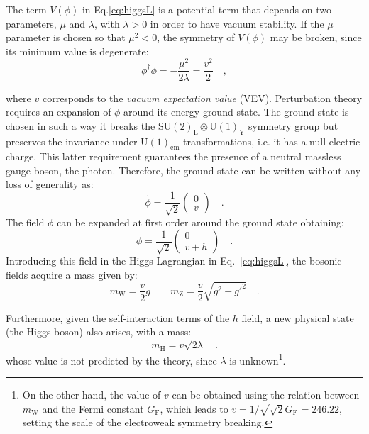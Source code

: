 The term $V(\phi)$ in Eq.\eqref{eq:higgsL} is a potential term that depends on two parameters, $\mu$ and $\lambda$, with $\lambda>0$ in order to have vacuum stability. If the $\mu$ parameter is chosen so that $\mu^2<0$, the symmetry of $V(\phi)$ may be broken, since its minimum value is degenerate:
\begin{equation}
\phi^\dagger\phi = -\frac{\mu^2}{2\lambda} = \frac{v^2}{2} \quad ,
\end{equation}

\noindent where $v$ corresponds to the \emph{vacuum expectation value} (VEV). Perturbation theory requires an expansion of $\phi$ around its energy ground state. The ground state is chosen in such a way it  breaks the $\mathrm{SU(2)_L \otimes U(1)_Y}$ symmetry group but preserves the invariance under $\mathrm{U(1)_{em}}$ transformations, i.e. it has a null electric charge. This latter requirement guarantees the presence of a neutral massless gauge boson, the photon. Therefore, the ground state can be written without any loss of generality as:
\begin{equation}
\tilde{\phi} = \frac{1}{\sqrt{2}} \begin{pmatrix} 0 \\ v   \end{pmatrix}\quad .
\end{equation}
The field $\phi$ can be expanded at first order around the ground state obtaining:
\begin{equation}
\phi = \frac{1}{\sqrt{2}} \begin{pmatrix} 0 \\ v+h   \end{pmatrix}\quad .
\end{equation}
Introducing this field in the Higgs Lagrangian in Eq.~\eqref{eq:higgsL}, the bosonic fields acquire a mass given by:
\begin{equation}
m_\mathrm{W} = \frac{v}{2}g \qquad m_\mathrm{Z} = \frac{v}{2}\sqrt{g^2 +g'^2} \quad.
\end{equation}

Furthermore, given the self-interaction terms of the $h$ field, a new physical state (the Higgs boson) also arises, with a mass:
\begin{equation}
m_\mathrm{H} = v\sqrt{2\lambda} \quad.
\end{equation}
\noindent whose value is not predicted by the theory, since $\lambda$ is unknown\footnote{On the other hand, the value of $v$ can be obtained using the relation between $m_\mathrm{W}$ and the Fermi constant $G_\mathrm{F}$, which leads to $v = 1/\sqrt{\sqrt{2}G_\mathrm{F}} = 246.22$\GeV, setting the scale of the electroweak symmetry breaking.}.

